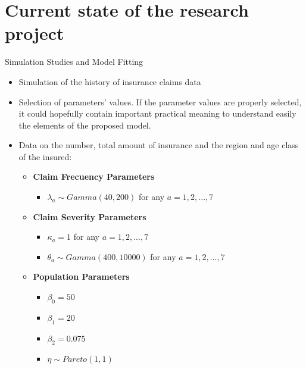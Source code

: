 \documentclass[10pt]{beamer} %
\begin{document}
\section{Current state of the research project}
\begin{frame}{Simulation Studies and Model Fitting}
\begin{itemize}
    \item Simulation of the history of insurance claims data
    \item Selection of parameters' values. If the parameter values are properly selected, it could hopefully contain important practical meaning to understand easily the elements of the proposed model.
\item  Data on the number, total amount of insurance and the region and age class of the insured:
    \begin{itemize}
	\item \textbf{Claim Frecuency Parameters}
	\begin{itemize}
		\item $\lambda_{a}\sim Gamma(40,200)$ for any $a=1,2,...,7$
	\end{itemize}
	\item \textbf{Claim Severity Parameters}
	\begin{itemize}
		\item $\kappa_{a}=1$ for any $a=1,2,...,7$
		\item $\theta_{a}\sim Gamma(400,10000)$ for any $a=1,2,...,7$ 
	\end{itemize}
	\item \textbf{Population Parameters}
	\begin{itemize}
		\item $\beta_{0}=50$
		\item $\beta_{1}=20$
		\item $\beta_{2}=0.075$
		\item $\eta\sim Pareto(1,1)$	
	\end{itemize}
\end{itemize}
\end{itemize}


\end{frame}
\end{document}
